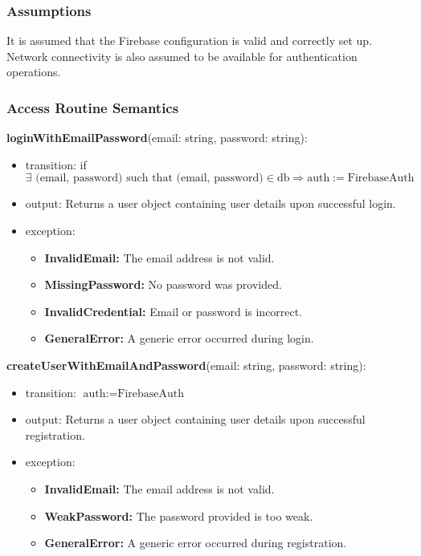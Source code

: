 \documentclass[12pt, titlepage]{article}
\begin{document}
\subsubsection{Assumptions}

It is assumed that the Firebase configuration is valid and correctly set up. Network connectivity is also assumed to be available for authentication operations.

\subsubsection{Access Routine Semantics}

\noindent \textbf{loginWithEmailPassword}(email: string, password: string):
\begin{itemize}
\item transition: if $\exists \text{ (email, password)} \text{ such that }
\text{(email, password)} \in \text{db} \Rightarrow \text{auth} :=
\text{FirebaseAuth}$
\item output: Returns a user object containing user details upon successful login.
\item exception: 
    \begin{itemize}
        \item \textbf{InvalidEmail:} The email address is not valid.
        \item \textbf{MissingPassword:} No password was provided.
        \item \textbf{InvalidCredential:} Email or password is incorrect.
        \item \textbf{GeneralError:} A generic error occurred during login.
    \end{itemize}
\end{itemize}

\noindent \textbf{createUserWithEmailAndPassword}(email: string, password: string):
\begin{itemize}
\item transition: $\text{auth} := \text{FirebaseAuth}$
\item output: Returns a user object containing user details upon successful registration.
\item exception: 
    \begin{itemize}
        \item \textbf{InvalidEmail:} The email address is not valid.
        \item \textbf{WeakPassword:} The password provided is too weak.
        \item \textbf{GeneralError:} A generic error occurred during registration.
    \end{itemize}
\end{itemize}
\end{document}
